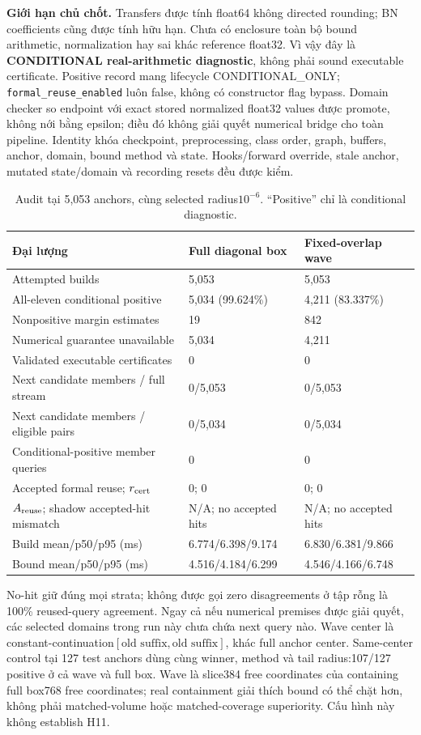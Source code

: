 \documentclass[11pt,a4paper]{article}
\newcommand{\code}[1]{{\small\ttfamily\nolinkurl{#1}}}
\theoremstyle{remark}
\begin{document}
\textbf{Giới hạn chủ chốt.} Transfers được tính float64 không directed
rounding; BN coefficients cũng được tính hữu hạn. Chưa có enclosure toàn
bộ bound arithmetic, normalization hay sai khác reference float32. Vì vậy
đây là \textbf{CONDITIONAL real-arithmetic diagnostic}, không phải sound
executable certificate. Positive record mang lifecycle CONDITIONAL\_ONLY;
\code{formal_reuse_enabled} luôn false, không có constructor flag bypass.
Domain checker so endpoint với exact stored normalized float32 values được
promote, không nới bằng epsilon; điều đó không giải quyết numerical bridge
cho toàn pipeline. Identity khóa checkpoint, preprocessing, class order,
graph, buffers, anchor, domain, bound method và state. Hooks/forward override,
stale anchor, mutated state/domain và recording resets đều được kiểm.

\begin{table}[!htbp]\centering\small
\caption{Audit tại 5,053 anchors, cùng selected radius$10^{-6}$.
``Positive'' chỉ là conditional diagnostic.}
\begin{tabularx}{\linewidth}{@{}p{6.9cm}YY@{}}\toprule
Đại lượng & Full diagonal box & Fixed-overlap wave\\\midrule
Attempted builds & 5,053 & 5,053\\
All-eleven conditional positive & 5,034 (99.624\%) & 4,211 (83.337\%)\\
Nonpositive margin estimates & 19 & 842\\
Numerical guarantee unavailable & 5,034 & 4,211\\
Validated executable certificates & 0 & 0\\
Next candidate members / full stream & 0/5,053 & 0/5,053\\
Next candidate members / eligible pairs & 0/5,034 & 0/5,034\\
Conditional-positive member queries & 0 & 0\\
Accepted formal reuse; $r_{\rm cert}$ & 0; 0 & 0; 0\\
$A_{\rm reuse}$; shadow accepted-hit mismatch & N/A; no accepted hits & N/A; no accepted hits\\
Build mean/p50/p95 (ms) & 6.774/6.398/9.174 & 6.830/6.381/9.866\\
Bound mean/p50/p95 (ms) & 4.516/4.184/6.299 & 4.546/4.166/6.748\\\bottomrule
\end{tabularx}
\end{table}
No-hit giữ đúng mọi strata; không được gọi zero disagreements ở tập rỗng
là 100\% reused-query agreement. Ngay cả nếu numerical premises được giải
quyết, các selected domains trong run này chưa chứa next query nào.
Wave center là constant-continuation$[\text{old suffix},\text{old suffix}]$,
khác full anchor center. Same-center control tại 127 test anchors dùng cùng
winner, method và tail radius:107/127 positive ở cả wave và full box.
Wave là slice384 free coordinates của containing full box768 free coordinates;
real containment giải thích bound có thể chặt hơn, không phải matched-volume
hoặc matched-coverage superiority. Cấu hình này không establish H11.
\end{document}
